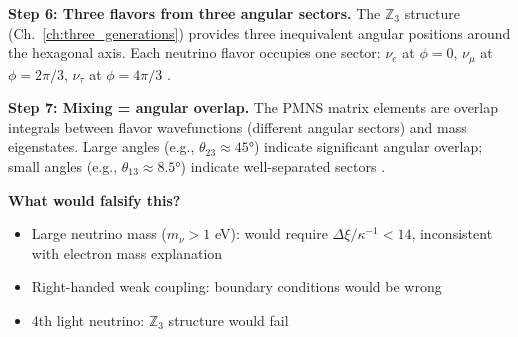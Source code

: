 \begin{tcolorbox}[colback=green!5!white, colframe=green!50!black,
    title=\textbf{Physical Process Narrative: How Neutrinos Become ``Ghostly''}]
\textbf{Step 6: Three flavors from three angular sectors.}
The $\mathbb{Z}_3$ structure (Ch.~\ref{ch:three_generations}) provides three inequivalent
angular positions around the hexagonal axis. Each neutrino flavor occupies one sector:
$\nu_e$ at $\phi = 0$, $\nu_\mu$ at $\phi = 2\pi/3$, $\nu_\tau$ at $\phi = 4\pi/3$ \tagI{}.

\textbf{Step 7: Mixing = angular overlap.}
The PMNS matrix elements are overlap integrals between flavor wavefunctions (different
angular sectors) and mass eigenstates. Large angles (e.g., $\theta_{23} \approx 45°$)
indicate significant angular overlap; small angles (e.g., $\theta_{13} \approx 8.5°$)
indicate well-separated sectors \tagP{}.

\textbf{What would falsify this?}
\begin{itemize}[nosep]
    \item Large neutrino mass ($m_\nu > 1$ eV): would require $\Delta\xi/\kappa^{-1} < 14$,
          inconsistent with electron mass explanation
    \item Right-handed weak coupling: boundary conditions would be wrong
    \item 4th light neutrino: $\mathbb{Z}_3$ structure would fail
\end{itemize}
\end{tcolorbox}


